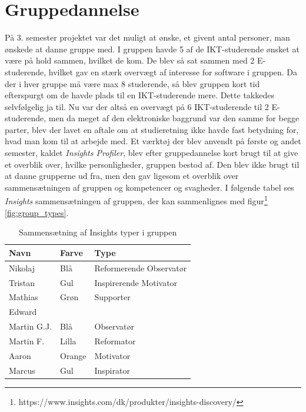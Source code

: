 \documentclass[a4paper,12pt,fleqn,oneside]{article}
\begin{document}
\section{Gruppedannelse}
På 3. semester projektet var det muligt at ønske, et givent antal personer, man ønskede at danne gruppe med. I gruppen havde 5 af de IKT-studerende ønsket at være på hold sammen, hvilket de kom. De blev så sat sammen med 2 E-studerende, hvilket gav en stærk overvægt af interesse for software i gruppen. Da der i hver gruppe må være max 8 studerende, så blev gruppen kort tid efterspurgt om de havde plads til en IKT-studerende mere. Dette takkedes selvfølgelig ja til. Nu var der altså en overvægt på 6 IKT-studerende til 2 E-studerende, men da meget af den elektroniske baggrund var  den samme for begge parter, blev der lavet en aftale om at studieretning ikke havde fast betydning for, hvad man kom til at arbejde med. Et værktøj der blev anvendt på første og andet semester, kaldet \textit{Insights Profiler}, blev efter gruppedannelse kort brugt til at give et overblik over, hvilke personligheder, gruppen bestod af. Den blev ikke brugt til at danne grupperne ud fra, men den gav ligesom et overblik over sammensætningen af gruppen og kompetencer og svagheder. I
følgende tabel ses \textit{Insights} sammensætningen af gruppen, der kan sammenlignes med figur\footnote{https://www.insights.com/dk/produkter/insights-discovery/} \ref{fig:group_types}.
\begin{table}[H]
\centering
\begin{tabular}{|L{0.2\textwidth}|L{0.2\textwidth}|L{0.4\textwidth}|}
\hline
\textbf{Navn} & \textbf{Farve} & \textbf{Type} \\ \hline
Nikolaj & Blå & Reformerende Observatør  \\ \hline
Tristan & Gul & Inspirerende Motivator\\ \hline
Mathias & Grøn & Supporter \\ \hline
Edward &  &  \\ \hline
Martin G.J. & Blå  & Observatør \\ \hline
Martin F. & Lilla & Reformator  \\ \hline
Aaron & Orange & Motivator \\ \hline
Marcus & Gul & Inspirator \\ \hline
\end{tabular}
\caption{Sammensætning af Insights typer i gruppen}
\label{table_group_types}
\end{table}
\end{document}
